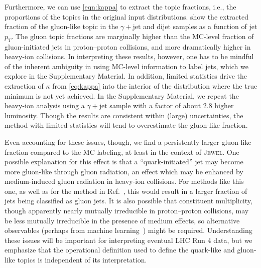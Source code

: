 \documentclass[aps,prl,twocolumn,preprintnumbers,showpacs,floatfix,nofootinbib]{revtex4-1}
\newcommand*{\jewel}{\textsc{Jewel}}
\newcommand{\Refc}[1]{Ref.~\cite{#1}}
\begin{document}
Furthermore, we can use \cref{eqn:kappa} to extract the topic fractions, i.e., the proportions of the topics in the original input distributions.
%
 show the extracted fraction of the gluon-like topic in the $\gamma+\text{jet}$ and dijet samples as a function of jet $p_T$.
%
The gluon topic fractions are marginally higher than the MC-level fraction of gluon-initiated jets in proton--proton collisions, and more dramatically higher in heavy-ion collisions.
%
In interpreting these results, however, one has to be mindful of the inherent ambiguity in using MC-level information to label jets, which we explore in the Supplementary Material.
%
In addition, limited statistics drive the extraction of $\kappa$ from \cref{eq:kappa} into the interior of the distribution where the true minimum is not yet achieved.
%
In the Supplementary Material, we repeat the heavy-ion analysis using a $\gamma+\text{jet}$ sample with a factor of about $2.8$ higher luminosity.
%
Though the results are consistent within (large) uncertainties, the method with limited statistics will tend to overestimate the gluon-like fraction.


Even accounting for these issues, though, we find a persistently larger gluon-like fraction compared to the MC labeling, at least in the context of \jewel.
%
One possible explanation for this effect is that a ``quark-initiated'' jet may become more gluon-like through gluon radiation, an effect which may be enhanced by medium-induced gluon radiation in heavy-ion collisions.
%
For methods like this one, as well as for the method in \Refc{Sirunyan:2020qvi}, this would result in a larger fraction of jets being classified as gluon jets.
%
It is also possible that constituent multiplicity, though apparently nearly mutually irreducible in proton--proton collisions, may be less mutually irreducible in the presence of medium effects, so alternative observables (perhaps from machine learning~\cite{Komiske:2018vkc}) might be required.
%
Understanding these issues will be important for interpreting eventual LHC Run 4 data, but we emphasize that the operational definition used to define the quark-like and gluon-like topics is independent of its interpretation.
\end{document}

